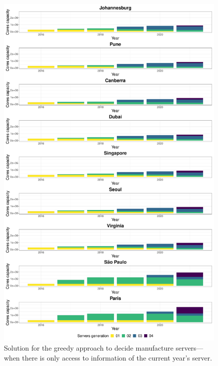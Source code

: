 \begin{figure}[ht]
\centering  
  \includegraphics[width=\linewidth]{images/dc_evolution_year_by_year.pdf}
  \caption{Solution for the greedy approach to decide manufacture servers---when there is only access to information of the current year's server.}
  \label{fig:dc_evolution_year_by_year}
\end{figure}


